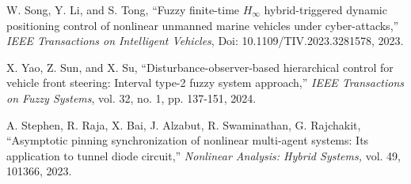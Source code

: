 \documentclass[preprint,11pt]{elsarticle}
\begin{document}
\begin{thebibliography}{00}
{W. Song, Y. Li, and S. Tong, ``Fuzzy finite-time $H_{\infty}$ hybrid-triggered dynamic positioning control of nonlinear unmanned marine vehicles under cyber-attacks,'' {\em IEEE Transactions on Intelligent Vehicles}, Doi: 10.1109/TIV.2023.3281578, 2023.}

{X. Yao, Z. Sun, and X. Su, ``Disturbance-observer-based hierarchical control for vehicle front steering: Interval type-2 fuzzy system approach,'' {\em IEEE Transactions on Fuzzy Systems}, vol. 32, no. 1, pp. 137-151, 2024.}

{A. Stephen, R. Raja, X. Bai, J. Alzabut, R. Swaminathan, G. Rajchakit, ``Asymptotic pinning synchronization of nonlinear multi-agent systems: Its application to tunnel diode circuit,'' {\em Nonlinear Analysis: Hybrid Systems,} vol. 49, 101366, 2023.}


\end{thebibliography}
\end{document}
